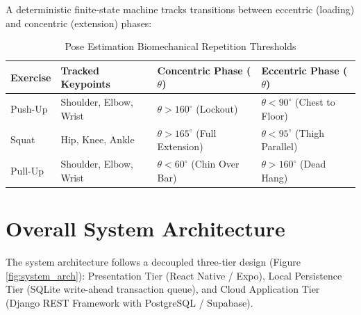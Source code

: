 \documentclass[12pt,a4paper]{report}
\begin{document}
A deterministic finite-state machine tracks transitions between eccentric (loading) and concentric (extension) phases:
\begin{table}[htbp]
\centering
\small
\renewcommand{\arraystretch}{1.25}
\begin{tabularx}{\textwidth}{|l|p{3.8cm}|p{3.4cm}|X|}
\hline
\textbf{Exercise} & \textbf{Tracked Keypoints} & \textbf{Concentric Phase ($\theta$)} & \textbf{Eccentric Phase ($\theta$)} \\
\hline
Push-Up & Shoulder, Elbow, Wrist & $\theta > 160^\circ$ (Lockout) & $\theta < 90^\circ$ (Chest to Floor) \\
\hline
Squat & Hip, Knee, Ankle & $\theta > 165^\circ$ (Full Extension) & $\theta < 95^\circ$ (Thigh Parallel) \\
\hline
Pull-Up & Shoulder, Elbow, Wrist & $\theta < 60^\circ$ (Chin Over Bar) & $\theta > 160^\circ$ (Dead Hang) \\
\hline
\end{tabularx}
\caption{Pose Estimation Biomechanical Repetition Thresholds}
\label{tab:kinematics_thresholds}
\end{table}

\section{Overall System Architecture}
The system architecture follows a decoupled three-tier design (Figure \ref{fig:system_arch}): Presentation Tier (React Native / Expo), Local Persistence Tier (SQLite write-ahead transaction queue), and Cloud Application Tier (Django REST Framework with PostgreSQL / Supabase).
\end{document}

